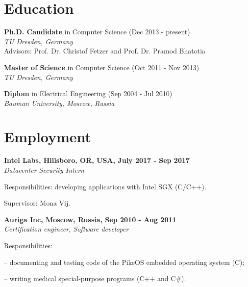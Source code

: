 \documentclass[letterpaper]{article}
\renewenvironment{itemize}{
  \begin{list}{}{
    \setlength{\leftmargin}{1.5em}
  }
}{
  \end{list}
}
\begin{document}
\section*{Education}

\begin{itemize}

 \item \textbf{Ph.D. Candidate} in Computer Science (Dec 2013 - present)\\
 {\em  TU Dresden, Germany}\\
Advisors: Prof. Dr. Christof Fetzer and Prof. Dr. Pramod Bhatotia

 \item \textbf{Master of Science} in Computer Science (Oct 2011 - Nov 2013) \\
 {\em  TU Dresden, Germany}

\item \textbf{Diplom} in Electrical Engineering (Sep 2004 - Jul 2010)\\
  {\em Bauman University, Moscow, Russia} 

\end{itemize}



\section*{Employment}

{\bf Intel Labs, Hillsboro, OR, USA, July 2017 - Sep 2017}\\
{\em Datacenter Security Intern}
\begin{itemize}
	\item Responsibilities: developing applications with Intel SGX (C/C++).
    \vspace{-2mm}
	\item Supervisor: Mona Vij.
\end{itemize}

\vspace{2mm}

{\bf Auriga Inc, Moscow, Russia, Sep 2010 - Aug 2011}\\
{\em Certification engineer, Software developer}
\begin{itemize}
	\item Responsibilities:
		\begin{itemize}
		\item -- documenting and testing code of the PikeOS embedded operating system (C);
		\item -- writing medical special-purpose programs (C++ and C\#).
		\end{itemize}
	\item 
\end{itemize}
\end{document}
